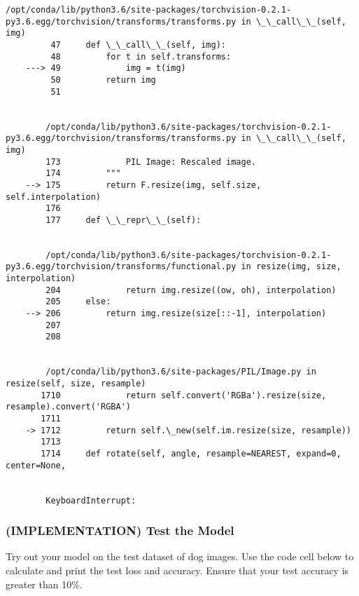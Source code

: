 \documentclass[11pt]{article}
\begin{document}
\begin{Verbatim}[commandchars=\\\{\}]
        /opt/conda/lib/python3.6/site-packages/torchvision-0.2.1-py3.6.egg/torchvision/transforms/transforms.py in \_\_call\_\_(self, img)
         47     def \_\_call\_\_(self, img):
         48         for t in self.transforms:
    ---> 49             img = t(img)
         50         return img
         51 


        /opt/conda/lib/python3.6/site-packages/torchvision-0.2.1-py3.6.egg/torchvision/transforms/transforms.py in \_\_call\_\_(self, img)
        173             PIL Image: Rescaled image.
        174         """
    --> 175         return F.resize(img, self.size, self.interpolation)
        176 
        177     def \_\_repr\_\_(self):


        /opt/conda/lib/python3.6/site-packages/torchvision-0.2.1-py3.6.egg/torchvision/transforms/functional.py in resize(img, size, interpolation)
        204             return img.resize((ow, oh), interpolation)
        205     else:
    --> 206         return img.resize(size[::-1], interpolation)
        207 
        208 


        /opt/conda/lib/python3.6/site-packages/PIL/Image.py in resize(self, size, resample)
       1710             return self.convert('RGBa').resize(size, resample).convert('RGBA')
       1711 
    -> 1712         return self.\_new(self.im.resize(size, resample))
       1713 
       1714     def rotate(self, angle, resample=NEAREST, expand=0, center=None,


        KeyboardInterrupt: 

    \end{Verbatim}

    \hypertarget{implementation-test-the-model}{%
\subsubsection{(IMPLEMENTATION) Test the
Model}\label{implementation-test-the-model}}

Try out your model on the test dataset of dog images. Use the code cell
below to calculate and print the test loss and accuracy. Ensure that
your test accuracy is greater than 10\%.
\end{document}
